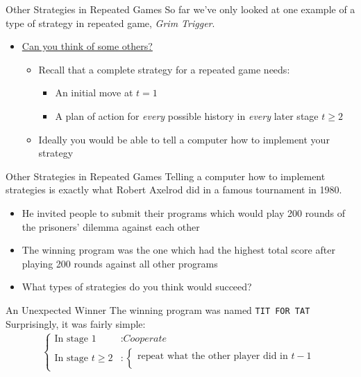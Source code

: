 \begin{frame}{Other Strategies in Repeated Games}
  So far we've only looked at one example of a type of strategy in repeated game, 
  \textit{Grim Trigger}. 
  \begin{itemize}
    \item \underline{Can you think of some others?}
    \begin{itemize}
      \item Recall that a complete strategy for a repeated game needs: 
      \begin{itemize}
        \item An initial move at $t=1$
        \item A plan of action for \textit{every} possible history in \textit{every} later stage $t\geq2$
      \end{itemize}
      \item Ideally you would be able to tell a computer how to implement your strategy
    \end{itemize}
  \end{itemize}
\end{frame}

\begin{frame}{Other Strategies in Repeated Games}
  Telling a computer how to implement strategies is exactly what Robert Axelrod did in a famous tournament in 1980.
  \begin{itemize}
    \item He invited people to submit their programs which would play 200 rounds of the prisoners' dilemma against each other 
    \item The winning program was the one which had the highest total score after playing 200 rounds against all other programs
    \item What types of strategies do you think would succeed?
  \end{itemize}
\end{frame}

\begin{frame}{An Unexpected Winner}
  The winning program was named \texttt{TIT FOR TAT} \\ 
  Surprisingly, it was fairly simple:
  \begin{align*}
    \begin{cases}
      \text{In stage } 1 & : \textit{Cooperate} \\ 
      \text{In stage } t \geq 2 & : 
      \begin{cases}
        \text{repeat what the other player did in } t-1 \\
      \end{cases}
    \end{cases}
  \end{align*}
\end{frame}

